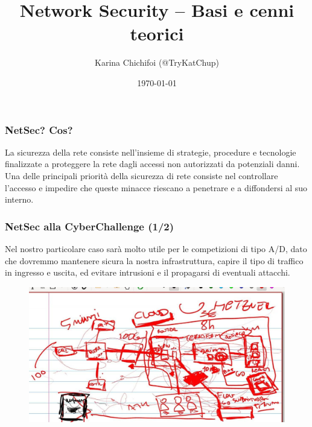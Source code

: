 \documentclass[aspectratio=169]{beamer}
\title{Network Security -- Basi e cenni teorici}
\author{Karina Chichifoi (@TryKatChup)}
\date{\today}
\begin{document}
 	\maketitle

	\begin{frame}
		\frametitle{NetSec? Cos?}
		La sicurezza della rete consiste nell'insieme di strategie, procedure e tecnologie finalizzate a proteggere la rete dagli accessi non autorizzati da potenziali danni.\\

		Una delle principali priorità della sicurezza di rete consiste nel controllare l'accesso e impedire che queste minacce riescano a penetrare e a diffondersi al suo interno.\\
	\end{frame}

	\begin{frame}
		\frametitle{NetSec alla CyberChallenge (1/2)}
	    Nel nostro particolare caso sarà molto utile per le competizioni di tipo A/D, dato che dovremmo mantenere sicura la nostra infrastruttura, capire il tipo di traffico in ingresso e uscita, ed evitare intrusioni e il propagarsi di eventuali attacchi.
        \begin{figure}
            \centering
            \includegraphics[scale=.3]{img/ctf-infra.jpg}
            \label{fig:infra}
        \end{figure}
	\end{frame} 
    
\end{document}
